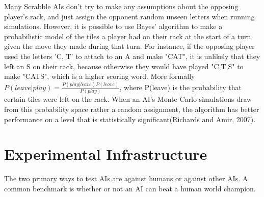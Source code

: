 \documentclass[12pt]{article}
\begin{document}
Many Scrabble AIs don't try to make any assumptions about the opposing
player's rack, and just assign the opponent random unseen letters when
running simulations. However, it is possible to use Bayes' algorithm
to make a probabilistic model of the tiles a player had on their rack
at the start of a turn given the move they made during that turn.%
For instance, if the opposing player used the letters 'C, T' to attach
to an A and make "CAT", it is unlikely that they left an S on their
rack, because otherwise they would have played "C,T,S" to make "CATS",
which is a higher scoring word. More formally $P(leave | play) =
\frac{P(play | leave)P(leave)}{P(play)}$, where P(leave) is the
probability that certain tiles were left on the rack. When an AI's
Monte Carlo simulations draw from this probability space rather a
random assignment, the algorithm has better performance on a level
that is statistically significant(Richards and Amir, 2007).

	



\section*{Experimental Infrastructure}
The two primary ways to test AIs are against humans or against other
AIs. A common benchmark is whether or not an AI can beat a human world
champion.
\end{document}
